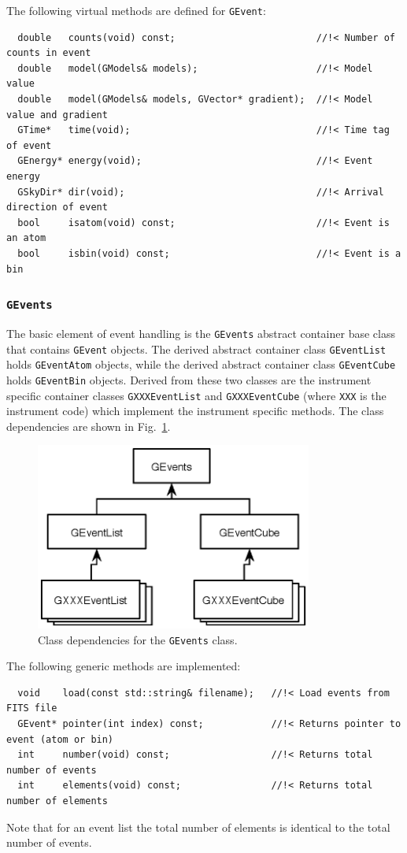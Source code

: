 \documentclass{article}[12pt,a4]
\begin{document}
The following virtual methods are defined for {\tt GEvent}:
\begin{verbatim}
  double   counts(void) const;                         //!< Number of counts in event
  double   model(GModels& models);                     //!< Model value
  double   model(GModels& models, GVector* gradient);  //!< Model value and gradient
  GTime*   time(void);                                 //!< Time tag of event
  GEnergy* energy(void);                               //!< Event energy
  GSkyDir* dir(void);                                  //!< Arrival direction of event
  bool     isatom(void) const;                         //!< Event is an atom
  bool     isbin(void) const;                          //!< Event is a bin
\end{verbatim}


\subsubsection{{\tt GEvents}}

The basic element of event handling is the {\tt GEvents} abstract container base class that
contains {\tt GEvent} objects.
The derived abstract container class {\tt GEventList} holds {\tt GEventAtom} objects, 
while the derived abstract container class {\tt GEventCube} holds {\tt GEventBin} objects.
Derived from these two classes are the instrument specific container classes
{\tt GXXXEventList} and {\tt GXXXEventCube} (where {\tt XXX} is the instrument code)
which implement the instrument specific methods.
The class dependencies are shown in Fig.~\ref{fig:GEvents}.
%
%
\begin{figure}[!h]
\centering
\includegraphics[width=9.1cm]{GEvents.eps}
\caption{Class dependencies for the {\tt GEvents} class.}
\label{fig:GEvents}
\end{figure}
%
%
The following generic methods are implemented:
\begin{verbatim}
  void    load(const std::string& filename);   //!< Load events from FITS file
  GEvent* pointer(int index) const;            //!< Returns pointer to event (atom or bin)
  int     number(void) const;                  //!< Returns total number of events
  int     elements(void) const;                //!< Returns total number of elements
\end{verbatim}
Note that for an event list the total number of elements is identical to the total
number of events.
\end{document}
